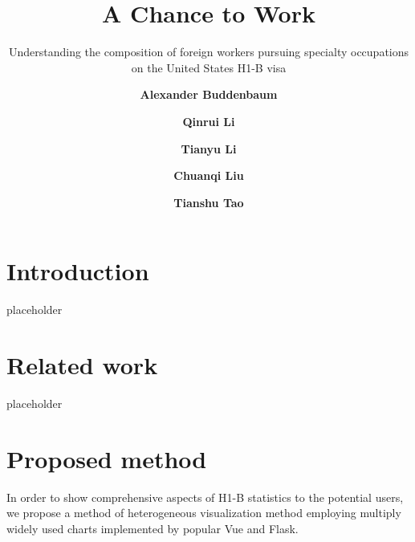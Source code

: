 \documentclass[sigconf]{acmart}
\begin{document}
\title{A Chance to Work}
\subtitle{Understanding the composition of foreign workers 
pursuing specialty occupations on the United States H1-B visa
}


\author{\textbf{Alexander Buddenbaum}}

\author{\textbf{Qinrui Li}}

\author{\textbf{Tianyu Li}}


\author{\textbf{Chuanqi Liu}}

\author{\textbf{Tianshu Tao}}



\maketitle

\section{Introduction}

placeholder

\section{Related work}

placeholder

\section{Proposed method}
In order to show comprehensive aspects of H1-B statistics to the potential users, we propose a method of 
heterogeneous visualization method employing multiply widely used charts implemented by popular Vue and Flask.
\end{document}
